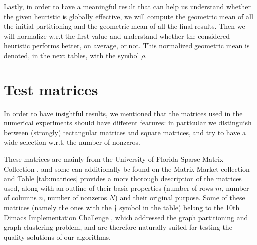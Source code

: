Lastly, in order to have a meaningful result that can help us understand whether the given heuristic is globally effective, we will compute the geometric mean of all the initial partitioning and the geometric mean of all the final results. Then we will normalize w.r.t the first value and understand whether the considered heuristic performs better, on average, or not. This normalized geometric mean is denoted, in the next tables, with the symbol $\rho$.

\section{Test matrices} \label{sec:test_matrices}

In order to have insightful results, we mentioned that the matrices used in the numerical experiments should have different features: in particular we distinguish between  (strongly) rectangular matrices and square matrices, and try to have a wide selection w.r.t. the number of nonzeros. 

These matrices are mainly from the University of Florida Sparse Matrix Collection \cite{ufl}, and some can additionally be found on the Matrix Market collection \cite{matrixmarket} and Table \ref{tab:matrices} provides a more thorough description of the matrices used, along with an outline of their basic properties (number of rows $m$, number of columns $n$, number of nonzeros $N$) and their original purpose. Some of these matrices (namely the ones with the $\dagger$ symbol in the table) belong to the 10th Dimacs Implementation Challenge \cite{dimacs}, which addressed the graph partitioning and graph clustering problem, and are therefore naturally suited for testing the quality solutions of our algorithms.

